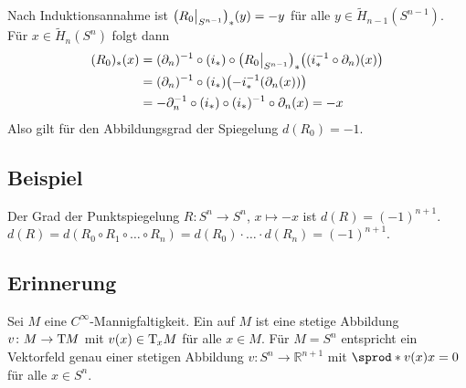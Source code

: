 \begin{description}
	Nach Induktionsannahme ist $\enbrace*{R_0\big|_{S^{n-1}}}_*(y)= -y$ für alle $y \in \tilde{H}_{n-1}(S^{n-1})$. Für $x \in \tilde{H}_n(S^n)$ folgt dann
	\begin{align*}
		(R_0)_*(x) &= (\partial_n) ^{-1} \circ  (i_*) \circ \enbrace*{R_0\big|_{S^{n-1}}}_* \enbrace[\big]{(i_* ^{-1} \circ \partial_n) (x)} \\
		&= (\partial_n) ^{-1} \circ (i_*) \enbrace*{- i_*^{-1} \enbrace*{\partial_n (x)} } \\
		&= - \partial_n ^{-1} \circ (i_*) \circ (i_*)^{-1} \circ \partial_n(x)= -x 
	\end{align*}
	Also gilt für den Abbildungsgrad der Spiegelung $d(R_0)=-1$. \bewende
\end{description}

\subsection[Beispiel: Grad der Punktspiegelung]{Beispiel} %
\label{sub:106}
Der Grad der Punktspiegelung $R \colon S^n \to S^n$, $x  \mapsto -x$ ist $d(R)=(-1)^{n+1}$.
$d(R)= d(R_0 \circ R_1 \circ \ldots \circ R_n) = d(R_0) \cdot \ldots \cdot d(R_n)= (-1)^{n+1}$. \bewende

\subsection[Erinnerung: Vektorfelder]{Erinnerung} %
\label{sub:107}
Sei $M$ eine $C^\infty$-Mannigfaltigkeit. Ein  auf $M$ ist eine stetige Abbildung $v \colon M \to \mathrm{T}\mkern-1.0mu M$ mit $v(x) \in \mathrm{T}\mkern-1.0mu_x M$ für alle $x \in M$.
Für $M=S^n$ entspricht ein Vektorfeld genau einer stetigen Abbildung $v \colon S^n \to \mathds{R}^{n+1}$ mit $\sprod*{v(x)}{x} =0$ für alle $x \in S^n$.
\begin{figure}[h]
\end{figure}


